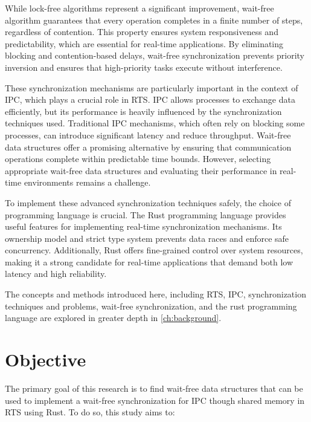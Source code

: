While lock-free algorithms represent a significant improvement, wait-free algorithm guarantees that every operation completes in a finite number of steps, regardless of contention. This property ensures system responsiveness and predictability, which are essential for real-time applications. By eliminating blocking and contention-based delays, wait-free synchronization prevents priority inversion and ensures that high-priority tasks execute without interference. \cite{kogan2012methodology, herlihy1991wait, brandenburg2019multiprocessorrealtimelockingprotocols}

These synchronization mechanisms are particularly important in the context of \ac{IPC}, which plays a crucial role in \ac{RTS}. \ac{IPC} allows processes to exchange data efficiently, but its performance is heavily influenced by the synchronization techniques used. Traditional \ac{IPC} mechanisms, which often rely on blocking some processes, can introduce significant latency and reduce throughput. Wait-free data structures offer a promising alternative by ensuring that communication operations complete within predictable time bounds. However, selecting appropriate wait-free data structures and evaluating their performance in real-time environments remains a challenge. \cite{timnat2014practical, michael1996simple, huang2002improvingWaitFree, pellegrini2020relevancewaitfreecoordinationalgorithms}

To implement these advanced synchronization techniques safely, the choice of programming language is crucial. The Rust programming language provides useful features for implementing real-time synchronization mechanisms. Its ownership model and strict type system prevents data races and enforce safe concurrency. Additionally, Rust offers fine-grained control over system resources, making it a strong candidate for real-time applications that demand both low latency and high reliability. \cite{xu2023rust, sharma2024rustembeddedsystemscurrent}

The concepts and methods introduced here, including \ac{RTS}, \ac{IPC}, synchronization techniques and problems, wait-free synchronization, and the rust programming language are explored in greater depth in \cref{ch:background}. 

\section{Objective}\label{sec:objective}

The primary goal of this research is to find wait-free data structures that can be used to implement a wait-free synchronization for \ac{IPC} though shared memory in \ac{RTS} using Rust. To do so, this study aims to:

